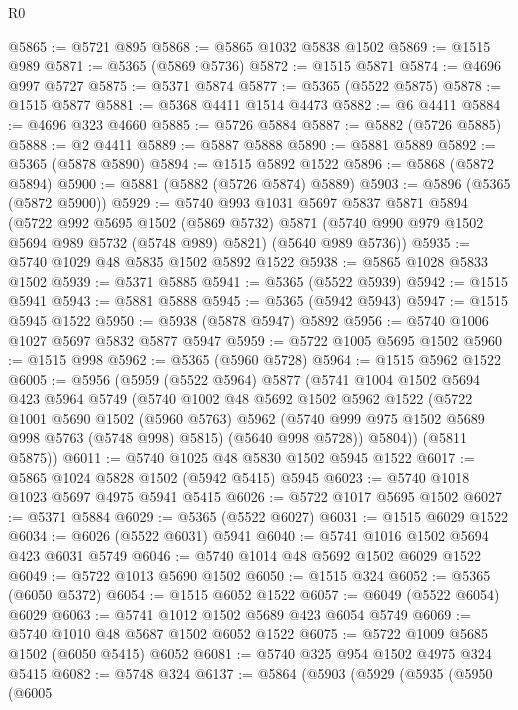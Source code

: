 \begin{lexlean}{R0}
\begin{coremodule}
@5865 := @5721 @895
@5868 := @5865 @1032 @5838 @1502
@5869 := @1515 @989
@5871 := @5365 (@5869 @5736)
@5872 := @1515 @5871
@5874 := @4696 @997 @5727
@5875 := @5371 @5874
@5877 := @5365 (@5522 @5875)
@5878 := @1515 @5877
@5881 := @5368 @4411 @1514 @4473
@5882 := @6 @4411
@5884 := @4696 @323 @4660
@5885 := @5726 @5884
@5887 := @5882 (@5726 @5885)
@5888 := @2 @4411
@5889 := @5887 @5888
@5890 := @5881 @5889
@5892 := @5365 (@5878 @5890)
@5894 := @1515 @5892 @1522
@5896 := @5868 (@5872 @5894)
@5900 := @5881 (@5882 (@5726 @5874) @5889)
@5903 := @5896 (@5365 (@5872 @5900))
@5929 := @5740
    @993
    @1031
    @5697
    @5837
    @5871
    @5894
    (@5722
      @992
      @5695
      @1502
      (@5869 @5732)
      @5871
      (@5740 @990 @979 @1502 @5694 @989 @5732 (@5748 @989) @5821)
      (@5640 @989 @5736))
@5935 := @5740 @1029 @48 @5835 @1502 @5892 @1522
@5938 := @5865 @1028 @5833 @1502
@5939 := @5371 @5885
@5941 := @5365 (@5522 @5939)
@5942 := @1515 @5941
@5943 := @5881 @5888
@5945 := @5365 (@5942 @5943)
@5947 := @1515 @5945 @1522
@5950 := @5938 (@5878 @5947) @5892
@5956 := @5740 @1006 @1027 @5697 @5832 @5877 @5947
@5959 := @5722 @1005 @5695 @1502
@5960 := @1515 @998
@5962 := @5365 (@5960 @5728)
@5964 := @1515 @5962 @1522
@6005 := @5956
    (@5959
      (@5522 @5964)
      @5877
      (@5741
        @1004
        @1502
        @5694
        @423
        @5964
        @5749
        (@5740
          @1002
          @48
          @5692
          @1502
          @5962
          @1522
          (@5722
            @1001
            @5690
            @1502
            (@5960 @5763)
            @5962
            (@5740 @999 @975 @1502 @5689 @998 @5763 (@5748 @998) @5815)
            (@5640 @998 @5728))
          @5804))
      (@5811 @5875))
@6011 := @5740 @1025 @48 @5830 @1502 @5945 @1522
@6017 := @5865 @1024 @5828 @1502 (@5942 @5415) @5945
@6023 := @5740 @1018 @1023 @5697 @4975 @5941 @5415
@6026 := @5722 @1017 @5695 @1502
@6027 := @5371 @5884
@6029 := @5365 (@5522 @6027)
@6031 := @1515 @6029 @1522
@6034 := @6026 (@5522 @6031) @5941
@6040 := @5741 @1016 @1502 @5694 @423 @6031 @5749
@6046 := @5740 @1014 @48 @5692 @1502 @6029 @1522
@6049 := @5722 @1013 @5690 @1502
@6050 := @1515 @324
@6052 := @5365 (@6050 @5372)
@6054 := @1515 @6052 @1522
@6057 := @6049 (@5522 @6054) @6029
@6063 := @5741 @1012 @1502 @5689 @423 @6054 @5749
@6069 := @5740 @1010 @48 @5687 @1502 @6052 @1522
@6075 := @5722 @1009 @5685 @1502 (@6050 @5415) @6052
@6081 := @5740 @325 @954 @1502 @4975 @324 @5415
@6082 := @5748 @324
@6137 := @5864
    (@5903
      (@5929
        (@5935
          (@5950
            (@6005

\end{coremodule}
\end{lexlean}
